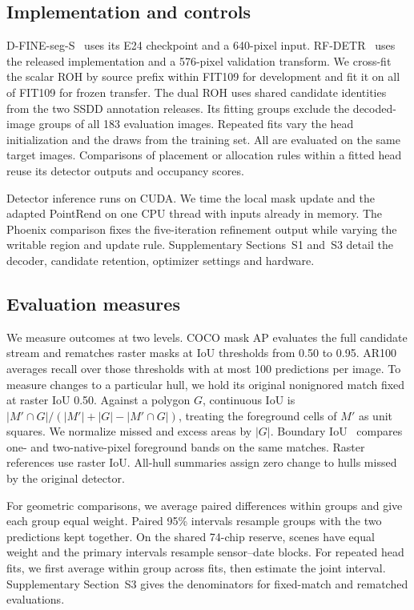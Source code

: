 \documentclass[journal]{IEEEtran}
\begin{document}
\subsection{Implementation and controls}

D-FINE-seg-S~\cite{dfine} uses its E24 checkpoint and a 640-pixel input. RF-DETR~\cite{rfdetr} uses the released implementation and a 576-pixel validation transform. We cross-fit the scalar ROH by source prefix within FIT109 for development and fit it on all of FIT109 for frozen transfer. The dual ROH uses shared candidate identities from the two SSDD annotation releases. Its fitting groups exclude the decoded-image groups of all 183 evaluation images. Repeated fits vary the head initialization and the draws from the training set. All are evaluated on the same target images. Comparisons of placement or allocation rules within a fitted head reuse its detector outputs and occupancy scores.

Detector inference runs on CUDA. We time the local mask update and the adapted PointRend on one CPU thread with inputs already in memory. The Phoenix comparison fixes the five-iteration refinement output while varying the writable region and update rule. Supplementary Sections~S1 and~S3 detail the decoder, candidate retention, optimizer settings and hardware.

\subsection{Evaluation measures}

We measure outcomes at two levels. COCO mask AP evaluates the full candidate stream and rematches raster masks at IoU thresholds from 0.50 to 0.95. AR100 averages recall over those thresholds with at most 100 predictions per image. To measure changes to a particular hull, we hold its original nonignored match fixed at raster IoU 0.50. Against a polygon \(G\), continuous IoU is \(|M'\cap G|/(|M'|+|G|-|M'\cap G|)\), treating the foreground cells of \(M'\) as unit squares. We normalize missed and excess areas by \(|G|\). Boundary IoU~\cite{boundaryiou} compares one- and two-native-pixel foreground bands on the same matches. Raster references use raster IoU. All-hull summaries assign zero change to hulls missed by the original detector.

For geometric comparisons, we average paired differences within groups and give each group equal weight. Paired 95\% intervals resample groups with the two predictions kept together. On the shared 74-chip reserve, scenes have equal weight and the primary intervals resample sensor--date blocks. For repeated head fits, we first average within group across fits, then estimate the joint interval. Supplementary Section~S3 gives the denominators for fixed-match and rematched evaluations.
\end{document}
